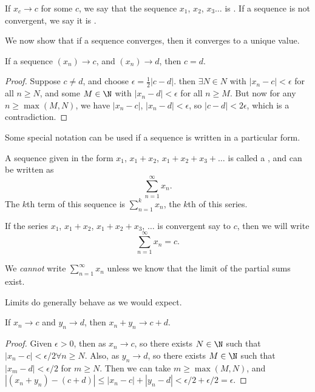 \begin{definition}
If $x_c \rightarrow c$ for some $c$, we say that the sequence $x_1$, $x_2$, $x_3 \dots$ is . If a sequence is not convergent, we say it is .
\end{definition}

We now show that if a sequence converges, then it converges to a unique value.

\begin{proposition}
If a sequence $(x_n) \rightarrow c$, and $(x_n) \rightarrow d$, then $c = d$.
\end{proposition}
\begin{proof}
	Suppose $c \neq d$, and choose $\epsilon = \frac{1}{2}|c - d|$. then $\exists N \in N$ with $|x_n - c| < \epsilon$ for all $n \geq N$, and some $M \in \N$ with $|x_n - d| < \epsilon$ for all $n \geq M$. But now for any $n \geq \max(M, N)$, we have $|x_n - c|$, $|x_n - d| < \epsilon$, so $|c - d| < 2 \epsilon$, which is a contradiction.
\end{proof}

Some special notation can be used if a sequence is written in a particular form.

\begin{definition}[Series]
	A sequence given in the form $x_1$, $x_1 + x_2$, $x_1 + x_2 + x_3 + \dots$ is called a , and can be written as
	$$
\sum_{n = 1}^\infty x_n.
	$$
	The $k$th term of this sequence is $\sum_{n = 1}^k x_n$, the $k$th  of this series.
\end{definition}

If the series $x_1$, $x_1 + x_2$, $x_1 + x_2 + x_3$, $\dots$ is convergent say to $c$, then we will write
$$
\sum_{n = 1}^{\infty} x_n = c.
$$
\begin{remark}[Warning]
	We \emph{cannot} write $\sum_{n = 1}^{\infty}x_n$ unless we know that the limit of the partial sums exist.
\end{remark}


Limits do generally behave as we would expect.

\begin{proposition}
	If $x_n \rightarrow c$ and $y_n \rightarrow d$, then $x_n + y_n \rightarrow c + d$.
\end{proposition}
\begin{proof}
	Given $\epsilon > 0$, then as $x_n \rightarrow c$, so there exists $N \in \N$ such that $|x_n - c| < \epsilon / 2 \forall n \geq N$. Also, as $y_n \rightarrow d$, so there exists $M \in \N$ such that $|x_m - d| < \epsilon / 2$ for $m \geq N$. Then we can take $m \geq \max(M, N)$, and $|(x_n + y_n) - (c + d)| \leq |x_n - c| + |y_n - d| < \epsilon/2 + \epsilon/2 = \epsilon$.
\end{proof}

